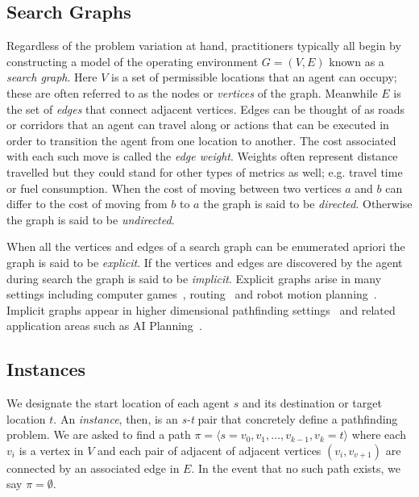 \subsection{Search Graphs}
\label{cha::lit::problem::graphs}
Regardless of the problem variation at hand, practitioners typically all begin
by constructing a model of the operating environment $G = (V, E)$ known as a 
\emph{search graph}. Here $V$ is a set of permissible locations that an agent
can occupy; these are often referred to as the nodes or \emph{vertices} of the
graph. Meanwhile $E$ is the set of \emph{edges} that connect adjacent vertices.
Edges can be thought of as roads or corridors that an agent can travel along or
actions that can be executed in order to transition the agent from one location
to another.  The cost associated with each such move is called the \emph{edge
weight}.  Weights often represent distance travelled but they could stand for
other types of metrics as well; e.g.  travel time or fuel consumption.  When the
cost of moving between two vertices $a$ and $b$ can differ to the cost of moving
from $b$ to $a$ the graph is said to be \emph{directed}.  Otherwise 
the graph is said to be \emph{undirected}.

When all the vertices and edges of a search graph can be enumerated apriori the
graph is said to be \emph{explicit}. If the vertices and edges are discovered
by the agent during search the graph is said to be \emph{implicit}.
Explicit graphs arise in many settings including computer 
games~\citep{davis00,tozour02,champandard09},
routing~\citep{sanders05,goldberg06} and robot motion
planning~\citep{latombe91,choset05}.  Implicit graphs appear in higher
dimensional pathfinding settings~\citep{lavalle98,bohlin00} and related
application areas such as AI Planning~\citep{russel03}.

\subsection{Instances}
\label{cha::lit::problem::instance}
We designate the start location of each agent $s$ and its destination or 
target location $t$. An \emph{instance}, then, is an \emph{s-t} pair that
concretely define a pathfinding problem. We are asked to find a path
$\pi = \langle  s = v_0, v_1, \ldots, v_{k-1},  v_k = t\rangle$ where each $v_i$
is a vertex in $V$ and each pair of adjacent of adjacent vertices $(v_i, v_{v+1})$ 
are connected by an associated edge in $E$.
In the event that no such path exists, we say $\pi = \emptyset$.
